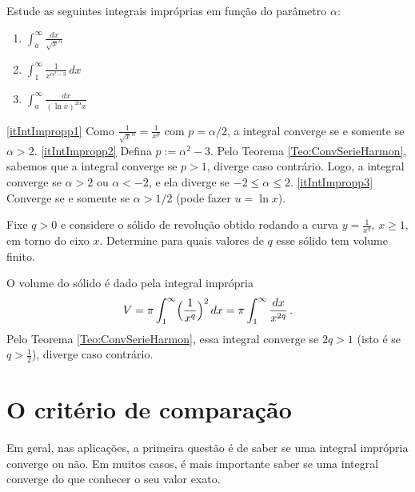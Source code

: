 
\begin{exo}
Estude as seguintes integrais impróprias em função do parâmetro $\alpha$:
\begin{multicols}{3}
\begin{enumerate}
\item\label{itIntImpropp1} $\int_a^\infty\frac{dx}{\sqrt{x}^\alpha}$
\item\label{itIntImpropp2} $\int_1^\infty\frac{1}{x^{\alpha^2-3}}\,dx$
\item\label{itIntImpropp3} $\int_a^\infty\frac{dx}{(\ln x)^{2\alpha} x}$
\end{enumerate}
\end{multicols}
\vspace{0.01cm}
\begin{sol}
\eqref{itIntImpropp1} Como $\frac{1}{\sqrt{x}^\alpha}=\frac{1}{x^{p}}$ com
$p=\alpha/2$, a integral 
converge se e somente se $\alpha>2$.
\eqref{itIntImpropp2} Defina $p:=\alpha^2-3$.
Pelo Teorema \ref{Teo:ConvSerieHarmon}, sabemos que a integral converge se
$p>1$, diverge caso contrário. Logo, a integral converge se
$\alpha>2$ ou $\alpha<-2$, e ela diverge se $-2\leq \alpha\leq 2$.
\eqref{itIntImpropp3} Converge se e somente se $\alpha>1/2$ (pode fazer $u=\ln
x$).
\end{sol}
\end{exo}


\begin{exo} Fixe $q>0$ e considere o sólido de revolução obtido rodando a
curva $y=\frac{1}{x^q}$, $x\geq 1$, em
torno do eixo $x$. Determine para quais valores de $q$ esse sólido tem volume
finito.
\begin{sol}
O volume do sólido é dado pela integral imprópria 
$$
V=\pi\int_1^\infty\Bigl(\frac{1}{x^q}\Bigr)^2\,dx=\pi\int_1^\infty\frac{dx}{
x^{2q}}\,.
$$
Pelo Teorema \ref{Teo:ConvSerieHarmon}, essa integral converge se $2q>1$ (isto
é se $q>\tfrac12$), diverge caso contrário.
\end{sol}
\end{exo}

\section{O critério de comparação}
Em geral, nas aplicações, a primeira questão é de saber se uma integral
imprópria converge ou não. Em muitos casos, é mais importante saber se uma
integral converge do que conhecer o seu valor exato.\\

